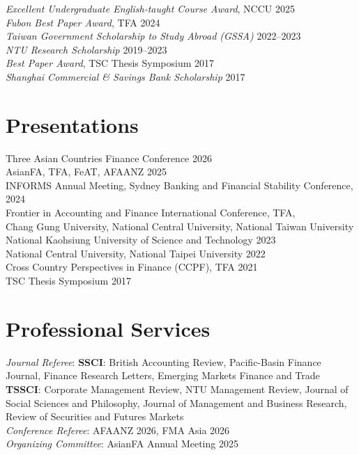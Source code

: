 \documentclass[
  english,
  margin]{res}
\begin{document}
\begin{resume}
\emph{Excellent Undergraduate English-taught Course Award}, NCCU
\hfill 2025\\
\emph{Fubon Best Paper Award}, TFA \hfill 2024\\
\emph{Taiwan Government Scholarship to Study Abroad (GSSA)}
\hfill 2022--2023\\
\emph{NTU Research Scholarship} \hfill 2019--2023\\
\emph{Best Paper Award}, TSC Thesis Symposium \hfill 2017\\
\emph{Shanghai Commercial \& Savings Bank Scholarship} \hfill 2017

\section{Presentations}\label{presentations}

Three Asian Countries Finance Conference \hfill 2026\\
AsianFA, TFA, FeAT, AFAANZ \hfill 2025\\
INFORMS Annual Meeting, Sydney Banking and Financial Stability
Conference, \hfill 2024\\
Frontier in Accounting and Finance International Conference, TFA,\\
Chang Gung University, National Central University, National Taiwan
University\\
National Kaohsiung University of Science and Technology \hfill 2023\\
National Central University, National Taipei University \hfill 2022\\
Cross Country Perspectives in Finance (CCPF), TFA \hfill 2021\\
TSC Thesis Symposium \hfill 2017

\section{\texorpdfstring{Professional
\newline Services}{Professional Services}}\label{professional-services}

\emph{Journal Referee}: \textbf{SSCI}: British Accounting Review,
Pacific-Basin Finance Journal, Finance Research Letters, Emerging
Markets Finance and Trade\\
\textbf{TSSCI}: Corporate Management Review, NTU Management Review,
Journal of Social Sciences and Philosophy, Journal of Management and
Business Research, Review of Securities and Futures Markets\\
\emph{Conference Referee}: AFAANZ 2026, FMA Asia 2026\\
\emph{Organizing Committee}: AsianFA Annual Meeting 2025


\end{resume}
\end{document}
